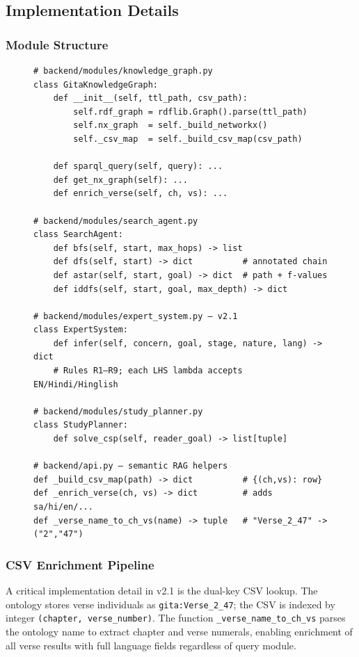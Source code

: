 \documentclass[conference]{IEEEtran}
\begin{document}
\subsection{Implementation Details}

\subsubsection{Module Structure}

\begin{figure}[!t]
\begin{lstlisting}[language=Python3, caption={Core module interfaces}]
# backend/modules/knowledge_graph.py
class GitaKnowledgeGraph:
    def __init__(self, ttl_path, csv_path):
        self.rdf_graph = rdflib.Graph().parse(ttl_path)
        self.nx_graph  = self._build_networkx()
        self._csv_map  = self._build_csv_map(csv_path)

    def sparql_query(self, query): ...
    def get_nx_graph(self): ...
    def enrich_verse(self, ch, vs): ...

# backend/modules/search_agent.py
class SearchAgent:
    def bfs(self, start, max_hops) -> list
    def dfs(self, start) -> dict          # annotated chain
    def astar(self, start, goal) -> dict  # path + f-values
    def iddfs(self, start, goal, max_depth) -> dict

# backend/modules/expert_system.py — v2.1
class ExpertSystem:
    def infer(self, concern, goal, stage, nature, lang) -> dict
    # Rules R1–R9; each LHS lambda accepts EN/Hindi/Hinglish

# backend/modules/study_planner.py
class StudyPlanner:
    def solve_csp(self, reader_goal) -> list[tuple]

# backend/api.py — semantic RAG helpers
def _build_csv_map(path) -> dict          # {(ch,vs): row}
def _enrich_verse(ch, vs) -> dict         # adds sa/hi/en/...
def _verse_name_to_ch_vs(name) -> tuple   # "Verse_2_47" -> ("2","47")
\end{lstlisting}
\end{figure}

\subsubsection{CSV Enrichment Pipeline}

A critical implementation detail in v2.1 is the dual-key CSV lookup. The
ontology stores verse individuals as \texttt{gita:Verse\_2\_47}; the CSV is
indexed by integer \texttt{(chapter, verse\_number)}. The function
\texttt{\_verse\_name\_to\_ch\_vs} parses the ontology name to extract
chapter and verse numerals, enabling enrichment of all verse results with
full language fields regardless of query module.
\end{document}
